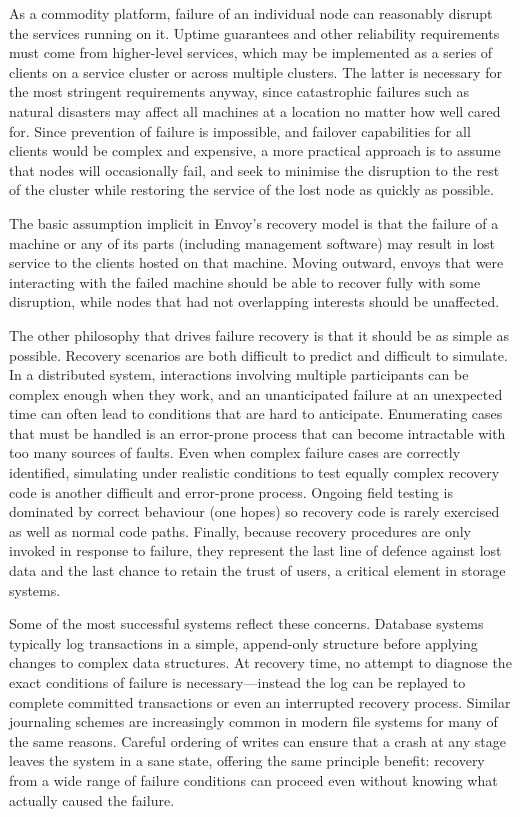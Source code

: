 As a commodity platform, failure of an individual node can reasonably disrupt the services running on it. Uptime guarantees and other reliability requirements must come from higher-level services, which may be implemented as a series of clients on a service cluster or across multiple clusters. The latter is necessary for the most stringent requirements anyway, since catastrophic failures such as natural disasters may affect all machines at a location no matter how well cared for. Since prevention of failure is impossible, and failover capabilities for all clients would be complex and expensive, a more practical approach is to assume that nodes will occasionally fail, and seek to minimise the disruption to the rest of the cluster while restoring the service of the lost node as quickly as possible.

The basic assumption implicit in Envoy's recovery model is that the failure of a machine or any of its parts (including management software) may result in lost service to the clients hosted on that machine. Moving outward, envoys that were interacting with the failed machine should be able to recover fully with some disruption, while nodes that had not overlapping interests should be unaffected.

The other philosophy that drives failure recovery is that it should be as simple as possible. Recovery scenarios are both difficult to predict and difficult to simulate. In a distributed system, interactions involving multiple participants can be complex enough when they work, and an unanticipated failure at an unexpected time can often lead to conditions that are hard to anticipate. Enumerating cases that must be handled is an error-prone process that can become intractable with too many sources of faults. Even when complex failure cases are correctly identified, simulating under realistic conditions to test equally complex recovery code is another difficult and error-prone process. Ongoing field testing is dominated by correct behaviour (one hopes) so recovery code is rarely exercised as well as normal code paths. Finally, because recovery procedures are only invoked in response to failure, they represent the last line of defence against lost data and the last chance to retain the trust of users, a critical element in storage systems.

Some of the most successful systems reflect these concerns. Database systems typically log transactions in a simple, append-only structure before applying changes to complex data structures. At recovery time, no attempt to diagnose the exact conditions of failure is necessary---instead the log can be replayed to complete committed transactions or even an interrupted recovery process. Similar journaling schemes are increasingly common in modern file systems for many of the same reasons. Careful ordering of writes can ensure that a crash at any stage leaves the system in a sane state, offering the same principle benefit: recovery from a wide range of failure conditions can proceed even without knowing what actually caused the failure.

